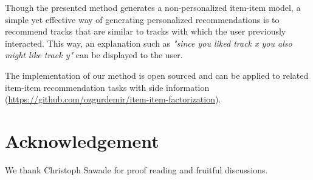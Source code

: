 \documentclass[twocolumn]{article}
\begin{document}
Though the presented method generates a non-personalized item-item model, a simple yet effective way of generating personalized recommendations is to  recommend tracks that are similar to tracks with which the user previously interacted. This way, an explanation such as \textit{"since you liked track x you also might like track y"} can be displayed to the user.

The implementation of our method is open sourced and can be applied to related item-item recommendation tasks with side information (\url{https://github.com/ozgurdemir/item-item-factorization}).

\section*{Acknowledgement}
We thank Christoph Sawade for proof reading and fruitful discussions.



\end{document}
